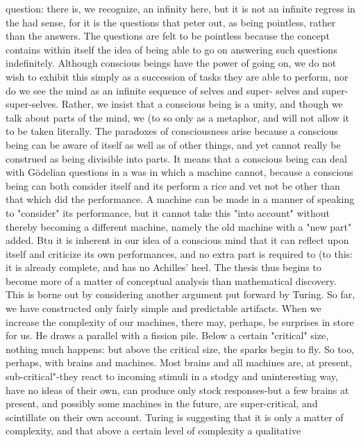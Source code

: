   question: there is, we recognize, an infinity here, but it is not an infinite regress in the had
  sense, for it is the questions that peter out, as being pointless, rather than the answers. The
  questions are felt to be pointless because the concept contains within itself the idea of
  being able to go on answering such questions indefinitely. Although conscious beings have
  the power of going on, we do not wish to exhibit this simply as a succession of tasks they
  are able to perform, nor do we see the mind as an infinite sequence of selves and super-
  selves and super-super-selves. Rather, we insist that a conscious being is a unity, and
  though we talk about parts of the mind, we (to so only as a metaphor, and will not allow it
  to be taken literally.
        The paradoxes of consciousness arise because a conscious being can be aware of itself
  as well as of other things, and yet cannot really be construed as being divisible into parts. It
  means that a conscious being can deal with Gödelian questions in a was in which a
  machine cannot, because a conscious being can both consider itself and its perform a rice
  and vet not be other than that which did the performance. A machine can be made in a
  manner of speaking to "consider" its performance, but it cannot take this "into account"
  without thereby becoming a different machine, namely the old machine with a "new part"
  added. Btu it is inherent in our idea of a conscious mind that it can reflect upon itself and
  criticize its own performances, and no extra part is required to (to this: it is already
  complete, and has no Achilles' heel.
        The thesis thus begins to become more of a matter of conceptual analysis than
  mathematical discovery. This is borne out by considering another argument put forward by
  Turing. So far, we have constructed only fairly simple and predictable artifacts. When we
  increase the complexity of our machines, there may, perhaps, be surprises in store for us.
  He draws a parallel with a fission pile. Below a certain "critical" size, nothing much
  happens: but above the critical size, the sparks begin to fly. So too, perhaps, with brains
  and machines. Most brains and all machines are, at present, sub-critical"-they react to
  incoming stimuli in a stodgy and uninteresting way, have no ideas of their own, can
  produce only stock responses-but a few brains at present, and possibly some machines in
  the future, are super-critical, and scintillate on their own account. Turing is suggesting that
  it is only a matter of complexity, and that above a certain level of complexity a qualitative
